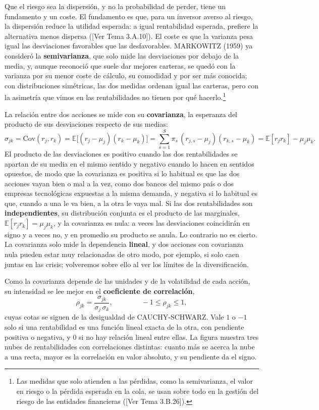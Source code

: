 \documentclass[10pt,a4paper]{article}
\newcommand{\authorfont}[1]{{\fontfamily{EBGaramond-TLF}\selectfont #1}}
\begin{document}
Que el riesgo sea la dispersión, y no la probabilidad de perder, tiene un fundamento y un coste. El fundamento es que, para un inversor averso al riesgo, la dispersión reduce la utilidad esperada: a igual rentabilidad esperada, prefiere la alternativa menos dispersa ([\authorfont{Ver Tema 3.A.10}]). El coste es que la varianza pesa igual las desviaciones favorables que las desfavorables. MARKOWITZ (1959) ya consideró la \textbf{semivarianza}, que solo mide las desviaciones por debajo de la media, y, aunque reconoció que suele dar mejores carteras, se quedó con la varianza por su menor coste de cálculo, su comodidad y por ser más conocida; con distribuciones simétricas, las dos medidas ordenan igual las carteras, pero con la asimetría que vimos en las rentabilidades no tienen por qué hacerlo.\footnote{%
    Las medidas que solo atienden a las pérdidas, como la semivarianza, el valor en riesgo o la pérdida esperada en la cola, se usan sobre todo en la gestión del riesgo de las entidades financieras ([\authorfont{Ver Tema 3.B.26}]).
}

La relación entre dos acciones se mide con su \textbf{covarianza}, la esperanza del producto de sus desviaciones respecto de sus medias:
$$\sigma_{jk}=\mathrm{Cov}(r_j,r_k)=\mathbb E\big[(r_j-\mu_j)(r_k-\mu_k)\big]=\sum_{s=1}^{S}\pi_s\,(r_{j,s}-\mu_j)(r_{k,s}-\mu_k)=\mathbb E[r_jr_k]-\mu_j\mu_k.$$
El producto de las desviaciones es positivo cuando las dos rentabilidades se apartan de su media en el mismo sentido y negativo cuando lo hacen en sentidos opuestos, de modo que la covarianza es positiva si lo habitual es que las dos acciones vayan bien o mal a la vez, como dos bancos del mismo país o dos empresas tecnológicas expuestas a la misma demanda, y negativa si lo habitual es que, cuando a una le va bien, a la otra le vaya mal. Si las dos rentabilidades son \textbf{independientes}, su distribución conjunta es el producto de las marginales, $\mathbb E[r_jr_k]=\mu_j\mu_k$, y la covarianza es nula: a veces las desviaciones coincidirán en signo y a veces no, y en promedio su producto se anula. Lo contrario no es cierto. La covarianza solo mide la dependencia \textbf{lineal}, y dos acciones con covarianza nula pueden estar muy relacionadas de otro modo, por ejemplo, si solo caen juntas en las crisis; volveremos sobre ello al ver los límites de la diversificación.

Como la covarianza depende de las unidades y de la volatilidad de cada acción, su intensidad se lee mejor en el \textbf{coeficiente de correlación},
$$\rho_{jk}=\frac{\sigma_{jk}}{\sigma_j\,\sigma_k},\qquad\qquad -1\leq\rho_{jk}\leq1,$$
cuyas cotas se siguen de la desigualdad de CAUCHY-SCHWARZ. Vale $1$ o $-1$ solo si una rentabilidad es una función lineal exacta de la otra, con pendiente positiva o negativa, y $0$ si no hay relación lineal entre ellas. La figura muestra tres nubes de rentabilidades con correlaciones distintas: cuanto más se acerca la nube a una recta, mayor es la correlación en valor absoluto, y su pendiente da el signo.
\end{document}
